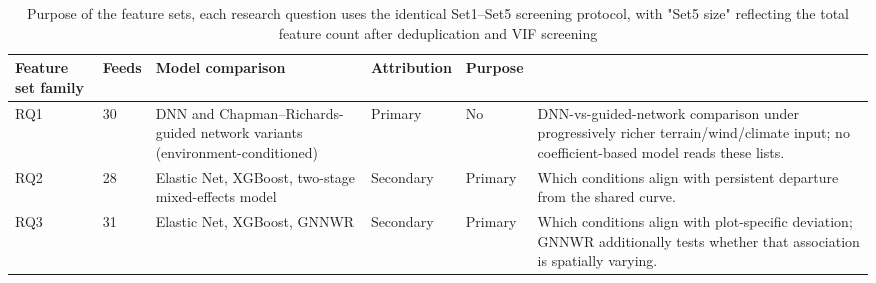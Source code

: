 \documentclass[11pt,a4paper]{report}
\begin{document}
\begin{table}[!htbp]
\centering
\scriptsize
\renewcommand{\arraystretch}{1.2}
\begin{tabular}{p{2.3cm}p{4.2cm}p{1.6cm}p{2cm}p{3.4cm}}
\toprule
Feature set family & Feeds & Model comparison & Attribution & Purpose \\
\midrule
RQ1 & 30 & DNN and Chapman--Richards-guided network variants (environment-conditioned) & Primary &
No & DNN-vs-guided-network comparison under progressively richer terrain/wind/climate input; no
coefficient-based model reads these lists. \\
RQ2 & 28 & Elastic Net, XGBoost, two-stage mixed-effects model & Secondary & Primary & Which
conditions align with persistent departure from the shared curve. \\
RQ3 & 31 & Elastic Net, XGBoost, GNNWR & Secondary & Primary & Which conditions align with
plot-specific deviation; GNNWR additionally tests whether that association is spatially
varying. \\
\bottomrule
\end{tabular}
\caption{Purpose of the feature sets, each research question uses the identical Set1--Set5 screening protocol, with "Set5 size" reflecting the total feature count after deduplication and VIF screening}
\label{tab:feature-set-purpose}
\end{table}
\end{document}
